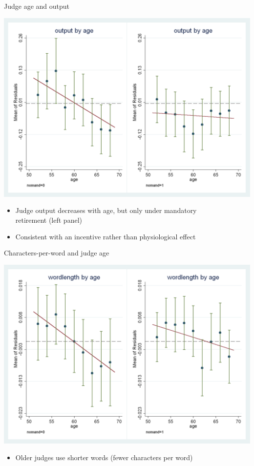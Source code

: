 \documentclass[english]{beamer}
\begin{document}
\begin{frame}{Judge age and output}
\begin{center}
\includegraphics[scale=0.19]{Images/ash_macleod3.png}
\end{center}
\vspace{-5pt}
\begin{itemize}
\setlength{\itemsep}{0.5em}
\setlength{\itemindent}{-0.5em}
\item Judge output decreases with age, but only under mandatory\\
\hspace{-5pt}retirement (left panel)
\item Consistent with an incentive rather than physiological effect
\end{itemize}
\end{frame}

\begin{frame}{Characters-per-word and judge age}
\begin{center}
\includegraphics[scale=0.19]{Images/ash_macleod4.png}
\end{center}
\vspace{-5pt}
\begin{itemize}
\setlength{\itemsep}{0.5em}
\setlength{\itemindent}{-0.5em}
\item Older judges use shorter words (fewer characters per word)
\end{itemize}
\end{frame}
\end{document}
